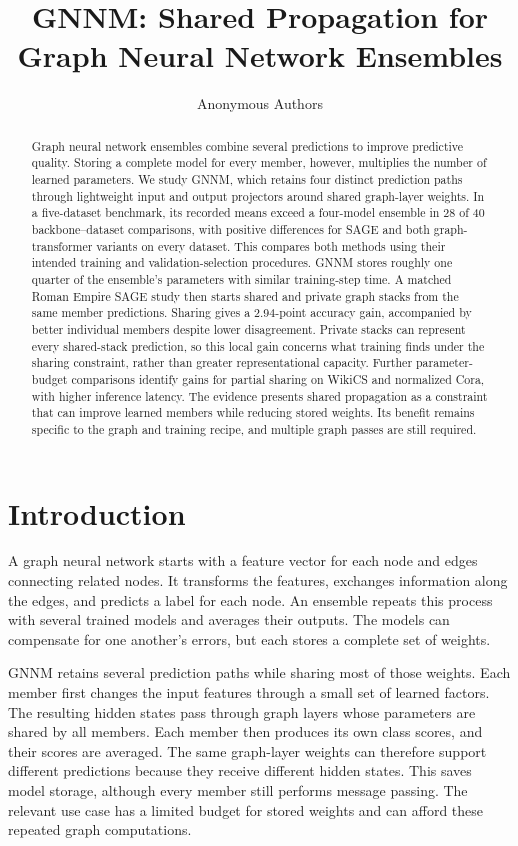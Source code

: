 \documentclass{article}
\title{GNNM: Shared Propagation for Graph Neural Network Ensembles}
\author{Anonymous Authors}
\begin{document}
\maketitle

\begin{abstract}
Graph neural network ensembles combine several predictions to improve predictive quality. Storing a complete model for every member, however, multiplies the number of learned parameters. We study GNNM, which retains four distinct prediction paths through lightweight input and output projectors around shared graph-layer weights. In a five-dataset benchmark, its recorded means exceed a four-model ensemble in 28 of 40 backbone--dataset comparisons, with positive differences for SAGE and both graph-transformer variants on every dataset. This compares both methods using their intended training and validation-selection procedures. GNNM stores roughly one quarter of the ensemble's parameters with similar training-step time. A matched Roman Empire SAGE study then starts shared and private graph stacks from the same member predictions. Sharing gives a 2.94-point accuracy gain, accompanied by better individual members despite lower disagreement. Private stacks can represent every shared-stack prediction, so this local gain concerns what training finds under the sharing constraint, rather than greater representational capacity. Further parameter-budget comparisons identify gains for partial sharing on WikiCS and normalized Cora, with higher inference latency. The evidence presents shared propagation as a constraint that can improve learned members while reducing stored weights. Its benefit remains specific to the graph and training recipe, and multiple graph passes are still required.
\end{abstract}

\section{Introduction}
A graph neural network starts with a feature vector for each node and edges connecting related nodes. It transforms the features, exchanges information along the edges, and predicts a label for each node. An ensemble repeats this process with several trained models and averages their outputs. The models can compensate for one another's errors, but each stores a complete set of weights.

GNNM retains several prediction paths while sharing most of those weights. Each member first changes the input features through a small set of learned factors. The resulting hidden states pass through graph layers whose parameters are shared by all members. Each member then produces its own class scores, and their scores are averaged. The same graph-layer weights can therefore support different predictions because they receive different hidden states. This saves model storage, although every member still performs message passing. The relevant use case has a limited budget for stored weights and can afford these repeated graph computations.
\end{document}
